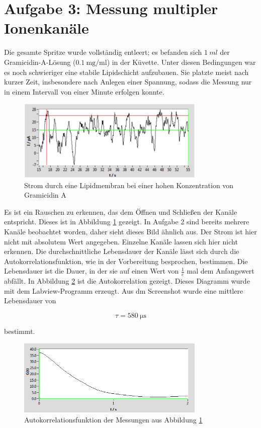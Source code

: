 \documentclass[a4paper,ngerman]{scrartcl}
\begin{document}
\section{Aufgabe 3: Messung multipler Ionenkanäle}

Die gesamte Spritze wurde vollständig entleert; es befanden sich $\SI{1}{ml}$ der Gramicidin-A-Lösung ($\SI{0.1}{\milli \gram \per \milli \litre}$) in der Küvette. Unter diesen Bedingungen war es noch schwieriger eine stabile Lipidschicht aufzubauen.
Sie platzte meist nach kurzer Zeit, insbesondere nach Anlegen einer Spannung, sodass die Messung nur in einem Intervall von einer Minute erfolgen konnte.

\begin{figure}[tbh!]
\includegraphics[width=0.8\textwidth]{abbildungen/mehrkanal_raw.png}
\caption{Strom durch eine Lipidmembran bei einer hohen Konzentration von Gramicidin A}
\label{fig:mehrkanal-roh}
\end{figure}


Es ist ein Rauschen zu erkennen, das dem Öffnen und Schließen der Kanäle entspricht. Dieses ist in Abbildung \ref{fig:mehrkanal-roh} gezeigt. In Aufgabe 2 sind bereits mehrere Kanäle beobachtet worden, daher sieht dieses Bild ähnlich aus. Der Strom ist hier nicht mit absolutem Wert angegeben. Einzelne Kanäle lassen sich hier nicht erkennen. Die durchschnittliche Lebensdauer der Kanäle lässt sich durch die Autokorrelationsfunktion, wie in der Vorbereitung besprochen, bestimmen. Die Lebensdauer ist die Dauer, in der sie auf einen Wert von $\frac{1}{e}$ mal dem Anfangswert abfällt. In Abbildung \ref{fig:mehrkanal-korrel} ist die Autokorrelation gezeigt. Dieses Diagramm wurde mit dem Labview-Programm erzeugt. Aus dm Screenshot wurde eine mittlere Lebensdauer von

\begin{equation}
\label{eqn:tau_mehrkanal}
\tau = \SI{580}{\micro\s}
\end{equation}

bestimmt.

\begin{figure}[tbh!]
\includegraphics[width=0.8\textwidth]{abbildungen/mehrkanal_korrel.png}
\caption{Autokorrelationsfunktion der Messungen aus Abbildung \ref{fig:mehrkanal-roh}}
\label{fig:mehrkanal-korrel}
\end{figure}
\end{document}
